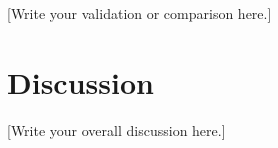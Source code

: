 [Write your validation or comparison here.]

\section{Discussion}
\label{sec:discussion}


[Write your overall discussion here.]




